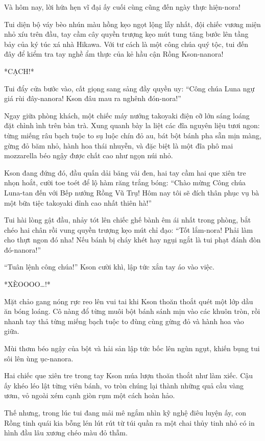 \documentclass[../main.tex]{subfiles}
\begin{document}
Và hôm nay, lời hứa hẹn vĩ đại ấy cuối cùng cũng đến ngày thực hiện-nora!

Tui diện bộ váy bèo nhún màu hồng kẹo ngọt lộng lẫy nhất, đội chiếc vương miện nhỏ xíu trên đầu, tay cầm cây quyền trượng kẹo mút tung tăng bước lên tầng bảy của ký túc xá nhà Hikawa. Với tư cách là một công chúa quý tộc, tui đến đây để kiểm tra tay nghề ẩm thực của kẻ hầu cận Rồng Kson-nanora!

*CẠCH!*

Tui đẩy cửa bước vào, cất giọng sang sảng đầy quyền uy: ``Công chúa Luna ngự giá rùi đây-nanora! Kson đâu mau ra nghênh đón-nora!''

Ngay giữa phòng khách, một chiếc máy nướng takoyaki điện cỡ lớn sáng loáng đặt chình ình trên bàn trà. Xung quanh bày la liệt các đĩa nguyên liệu tươi ngon: từng miếng râu bạch tuộc to sụ luộc chín đỏ au, bát bột bánh pha sẵn mịn màng, gừng đỏ băm nhỏ, hành hoa thái nhuyễn, và đặc biệt là một đĩa phô mai mozzarella béo ngậy được chất cao như ngọn núi nhỏ.

Kson đang đứng đó, đầu quấn dải băng vải đen, hai tay cầm hai que xiên tre nhọn hoắt, cười toe toét để lộ hàm răng trắng bóng: ``Chào mừng Công chúa Luna-tan đến với Bếp nướng Rồng Vũ Trụ! Hôm nay tôi sẽ đích thân phục vụ bà một bữa tiệc takoyaki đỉnh cao nhất thiên hà!''

Tui hài lòng gật đầu, nhảy tót lên chiếc ghế bành êm ái nhất trong phòng, bắt chéo hai chân rồi vung quyền trượng kẹo mút chỉ đạo: ``Tốt lắm-nora! Phải làm cho thựt ngon đó nha! Nếu bánh bị cháy khét hay ngụi ngắt là tui phạt đánh đòn đó-nanora!''

``Tuân lệnh công chúa!'' Kson cười khì, lập tức xắn tay áo vào việc.

*XÈOOOO\dots!*

Mặt chảo gang nóng rực reo lên vui tai khi Kson thoăn thoắt quét một lớp dầu ăn bóng loáng. Cô nàng đổ từng muôi bột bánh sánh mịn vào các khuôn tròn, rồi nhanh tay thả từng miếng bạch tuộc to đùng cùng gừng đỏ và hành hoa vào giữa.

Mùi thơm béo ngậy của bột và hải sản lập tức bốc lên ngùn ngụt, khiến bụng tui sôi lên ùng ục-nanora.

Hai chiếc que xiên tre trong tay Kson múa lượn thoăn thoắt như làm xiếc. Cậu ấy khéo léo lật từng viên bánh, vo tròn chúng lại thành những quả cầu vàng ươm, vỏ ngoài xém cạnh giòn rụm một cách hoàn hảo.

Thế nhưng, trong lúc tui đang mải mê ngắm nhìn kỹ nghệ điêu luyện ấy, con Rồng tinh quái kia bỗng lén lút rút từ túi quần ra một chai thủy tinh nhỏ có in hình đầu lâu xương chéo màu đỏ thẫm.
\end{document}
